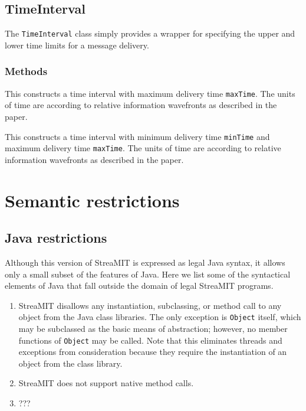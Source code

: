 \subsection{TimeInterval}

The {\tt TimeInterval} class simply provides a wrapper for specifying
the upper and lower time limits for a message delivery.

\subsubsection{Methods}

  This constructs a time interval with maximum delivery time {\tt maxTime}.  The units of time are according to relative information wavefronts as described in the paper.

  This constructs a time interval with minimum delivery time {\tt minTime} and maximum delivery time {\tt maxTime}.  The units of time are according to relative information wavefronts as described in the paper.

\section{Semantic restrictions}

\subsection{Java restrictions}
\label{sec:javarestrict}

Although this version of StreaMIT is expressed as legal Java syntax,
it allows only a small subset of the features of Java.  Here we list
some of the syntactical elements of Java that fall outside the domain
of legal StreaMIT programs.
\begin{enumerate}

\item StreaMIT disallows any instantiation, subclassing, or method
call to any object from the Java class libraries.  The only exception
is {\tt Object} itself, which may be subclassed as the basic means of
abstraction; however, no member functions of {\tt Object} may be
called.  Note that this eliminates threads and exceptions from
consideration because they require the instantiation of an object from
the class library.

\item StreaMIT does not support native method calls.

\item ???

\end{enumerate}

